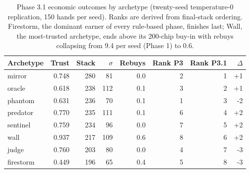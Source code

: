 \begin{table}[!t]
\centering
\footnotesize
\setlength{\tabcolsep}{3pt}
\begin{tabular}{lrrrrrrr}
\hline
Archetype & Trust & Stack & $\sigma$ & Rebuys & Rank P3 & Rank P3.1 & $\Delta$ \\
\hline
mirror & 0.748 & 280 & 81 & 0.0 & 2 & 1 & +1 \\
oracle & 0.618 & 238 & 112 & 0.1 & 3 & 2 & +1 \\
phantom & 0.631 & 236 & 70 & 0.1 & 1 & 3 & -2 \\
predator & 0.770 & 235 & 111 & 0.1 & 6 & 4 & +2 \\
sentinel & 0.759 & 234 & 96 & 0.0 & 7 & 5 & +2 \\
wall & 0.937 & 217 & 109 & 0.6 & 8 & 6 & +2 \\
judge & 0.760 & 203 & 80 & 0.0 & 4 & 7 & -3 \\
firestorm & 0.449 & 196 & 65 & 0.4 & 5 & 8 & -3 \\
\hline
\end{tabular}
\caption{Phase 3.1 economic outcomes by archetype (twenty-seed temperature-0 replication, 150 hands per seed). Ranks are derived from final-stack ordering. Firestorm, the dominant earner of every rule-based phase, finishes last; Wall, the most-trusted archetype, ends above its 200-chip buy-in with rebuys collapsing from 9.4 per seed (Phase 1) to 0.6.}
\label{tab:archetype-p31}
\end{table}
